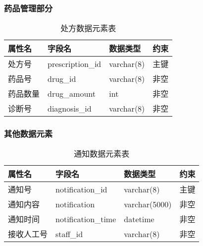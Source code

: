 \documentclass{article}
\begin{document}
\subsubsection{药品管理部分}

\begin{table}[H]
    \centering
    \begin{tabularx}{\textwidth}{|>{\raggedright\arraybackslash}X|>{\raggedright\arraybackslash}X|>{\raggedright\arraybackslash}X|>{\raggedright\arraybackslash}X|}
    \toprule
    \textbf{属性名} & \textbf{字段名} & \textbf{数据类型} & \textbf{约束} \\ \midrule
    处方号 & prescription\_id & varchar(8) & 主键 \\ \midrule
    药品号 & drug\_id & varchar(8) & 非空 \\ \midrule
    药品数量 & drug\_amount & int & 非空 \\ \midrule
    诊断号 & diagnosis\_id & varchar(8) & 非空 \\ \bottomrule
    \end{tabularx}
    \caption{处方数据元素表}
    \label{tab:prescription_elements}
\end{table}

\subsubsection{其他数据元素}

\begin{table}[H]
    \centering
    \begin{tabularx}{\textwidth}{|>{\raggedright\arraybackslash}X|>{\raggedright\arraybackslash}X|>{\raggedright\arraybackslash}X|>{\raggedright\arraybackslash}X|}
    \toprule
    \textbf{属性名} & \textbf{字段名} & \textbf{数据类型} & \textbf{约束} \\ \midrule
    通知号 & notification\_id & varchar(8) & 主键 \\ \midrule
    通知内容 & notification & varchar(5000) & 非空 \\ \midrule
    通知时间 & notification\_time & datetime & 非空 \\ \midrule
    接收人工号 & staff\_id & varchar(8) & 非空 \\ \bottomrule
    \end{tabularx}
    \caption{通知数据元素表}
    \label{tab:notification_elements}   
\end{table}
\end{document}
